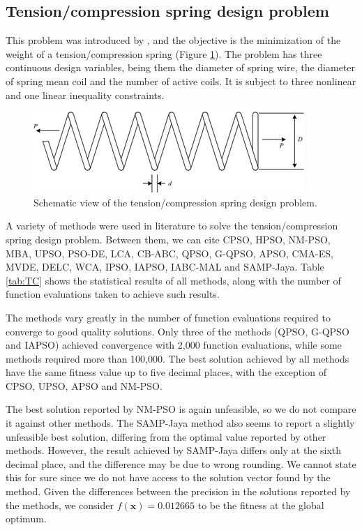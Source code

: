 \subsection{Tension/compression spring design problem}

This problem was introduced by \cite{TC}, and the objective is the minimization of the weight of a tension/compression spring (Figure \ref{fig:TC}). The problem has three continuous design variables, being them the diameter of spring wire, the diameter of spring mean coil and the number of active coils. It is subject to three nonlinear and one linear inequality constraints.

\begin{figure}[h]
\begin{center}
\includegraphics[scale=0.6]{Imgs/TC.png}
\end{center}
\captionsetup{justification=centering}
\caption{Schematic view of the tension/compression spring design problem.}\label{fig:TC}
\end{figure}


A variety of methods were used in literature to solve the tension/compression spring design problem. Between them, we can cite CPSO, HPSO, NM-PSO, MBA, UPSO, PSO-DE, LCA, CB-ABC, QPSO, G-QPSO, APSO, CMA-ES, MVDE, DELC, WCA, IPSO, IAPSO, IABC-MAL and SAMP-Jaya. Table \ref{tab:TC} shows the statistical results of all methods, along with the number of function evaluations taken to achieve such results.




The methods vary greatly in the number of function evaluations required to converge to good quality solutions. Only three of the methods (QPSO, G-QPSO and IAPSO) achieved convergence with 2,000 function evaluations, while some methods required more than 100,000. The best solution achieved by all methods have the same fitness value up to five decimal places, with the exception of CPSO, UPSO, APSO and NM-PSO.
 
The best solution reported by NM-PSO is again unfeasible, so we do not compare it against other methods. The SAMP-Jaya method also seems to report a slightly unfeasible best solution, differing from the optimal value reported by other methods. However, the result achieved by SAMP-Jaya differs only at the sixth decimal place, and the difference may be due to wrong rounding. We cannot state this for sure since we do not have access to the solution vector found by the method. Given the differences between the precision in the solutions reported by the methods, we consider $f(\bm{x}) = 0.012665$ to be the fitness at the global optimum.


